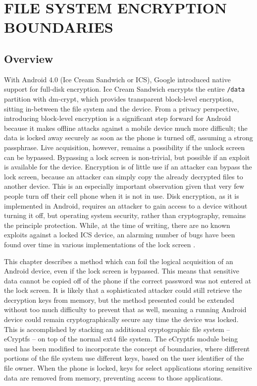 \chapter{FILE SYSTEM ENCRYPTION BOUNDARIES}
\label{ch:ecryptfs}

\section{Overview} 
With Android 4.0 (Ice Cream Sandwich or ICS), Google introduced native support for full-disk encryption. Ice Cream Sandwich encrypts
the entire \texttt{/data} partition with dm-crypt, which provides transparent block-level encryption, sitting in-between
the file system and the device. From a privacy perspective, introducing block-level encryption is a significant step forward for
Android because it makes offline attacks against a mobile device much more difficult; the data is locked away securely as soon as
the phone is turned off, assuming a strong passphrase. Live acquisition, however, remains a possibility if the unlock screen can be
bypassed.  Bypassing a lock screen is non-trivial, but possible if an exploit is available for the device. Encryption is of little
use if an attacker can bypass the lock screen, because an attacker can simply copy the already decrypted files to another device.
This is an especially important observation given that very few people turn off their cell phone when it is not in use. Disk
encryption, as it is implemented in Android, requires an attacker to gain access to a device without turning it off, but operating
system security, rather than cryptography, remains the principle protection. While, at the time of writing, there are no known
exploits against a locked ICS device, an alarming number of bugs have been found over time in various implementations of the lock
screen \cite{hoog, lockscreenbypass0, lockscreenbypass1, lockscreenbypass2}.

This chapter describes a method which can foil the logical acquisition of an Android device, even if the lock screen is
bypassed. This means that sensitive data cannot be copied off of the phone if the correct password was not entered at the lock
screen. It is likely that a sophisticated attacker could still retrieve the decryption keys from memory, but the method presented
could be extended without too much difficulty to prevent that as well, meaning a running Android device could remain
cryptographically secure any time the device was locked. This is accomplished by stacking an additional cryptographic file system 
-- eCryptfs -- on top of the normal ext4 file system. The eCryptfs module being used has been modified to incorporate the concept of
boundaries, where different portions of the file system use different keys, based on the user identifier of the file owner. When the phone
is locked, keys for select applications storing sensitive data are removed from memory, preventing access to those applications.

